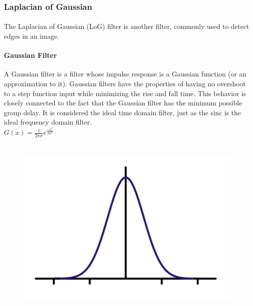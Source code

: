 \documentclass{article}
\begin{document}
		\paragraph{}
		\paragraph{}
		\paragraph{}
		\paragraph{}

		\subsubsection{Laplacian of Gaussian}
		\paragraph{}
		The Laplacian of Gaussian (LoG) filter is another filter, commonly used to detect edges in an image.\\
		\paragraph{Gaussian Filter}
		A Gaussian filter is a filter whose impulse response is a Gaussian function (or an approximation to it). Gaussian filters have the properties of having no overshoot to a step function input while minimizing the rise and fall time. This behavior is closely connected to the fact that the Gaussian filter has the minimum possible group delay. It is considered the ideal time domain filter, just as the sinc is the ideal frequency domain filter. \\
		$G(x) = \frac{1}{2\pi\sigma}e^{\frac{-x^2}{2\sigma^2}}$ \\ \\

		\begin{figure}[H]
			\center
			\includegraphics[width=0.3\linewidth]{images/impulse_response_of_gaussian.png}
			\label{fig:text10}
		\end{figure}
\end{document}
